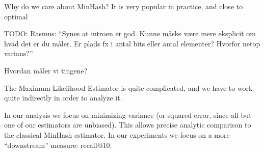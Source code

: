 Why do we care about MinHash?
It is very popular in practice, and close to optimal~\cite{pagh2014min}

TODO: Rasmus: ``Synes at introen er god. Kunne måske være mere eksplicit om hvad det er du måler. Er plads fx i antal bits eller antal elementer? Hvorfor netop varians?''

Hvordan måler vi tingene?

The Maximum Likelihood Estimator is quite complicated, and we have to work quite indirectly in order to analyze it.

In our analysis we focus on minimizing variance (or squared error, since all but one of our estimators are unbiased).
This allows precise analytic comparison to the classical MinHash estimator.
In our experiments we focus on a more ``downstream'' measure: recall@10.



